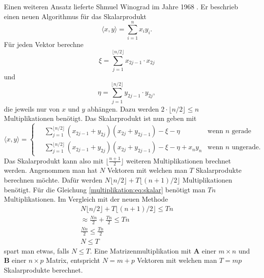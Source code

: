 Einen weiteren Ansatz lieferte Shmuel Winograd im Jahre 1968 \cite{multiplikation:winograd_1968}.
Er beschrieb einen neuen Algorithmus f\"ur das Skalarprodukt
\begin{equation} \label{multiplikation:eq:skalar}
	\langle x,y \rangle = \sum_{i=1}^{n}x_i y_i.
\end{equation}
F\"ur jeden Vektor berechne
\begin{equation}
	\xi = \sum_{j=1}^{ \lfloor n/2 \rfloor} x_{2j-1} \cdot x_{2j}
\end{equation}
und
\begin{equation}
	\eta = \sum_{j=1}^{ \lfloor n/2 \rfloor} y_{2j-1} \cdot y_{2j},
\end{equation}
die jeweils nur von $x$ und $y$ abhängen.
Dazu werden $2 \cdot  \lfloor n/2 \rfloor \leq n$ Multiplikationen benötigt.
Das Skalarprodukt ist nun geben mit
\begin{equation}
	\langle x,y \rangle =
	\begin{cases}
	 \displaystyle \quad \sum_{j=1}^{ \lfloor n/2 \rfloor} (x_{2j-1} + y_{2j})(x_{2j}+y_{2j-1})-\xi - \eta & \text{wenn  $n$ gerade}\\
	\displaystyle  \quad \sum_{j=1}^{ \lfloor n/2 \rfloor} (x_{2j-1} + y_{2j})(x_{2j}+y_{2j-1})-\xi - \eta + x_n y_n & \text{wenn  $n$ ungerade}.
	\end{cases}
\end{equation}
Das Skalarprodukt kann also mit $ \lfloor \frac{n+1}{2} \rfloor$ weiteren Multiplikationen brechnet werden.
Angenommen man hat $N$ Vektoren mit welchen man $T$ Skalarprodukte berechnen m\"ochte.
Daf\"ur werden $N\lfloor n/2 \rfloor + T\lfloor (n+1)/2 \rfloor $ Multiplikationen ben\"otigt.
Für die Gleichung \eqref{multiplikation:eq:skalar} benötigt man $Tn$ Multiplikationen.
Im Vergleich mit der neuen Methode
\begin{equation}
	\begin{split}\label{multiplikation:eq:eff}
		N\lfloor n/2 \rfloor + T\lfloor (n+1)/2 \rfloor \leq Tn \\
		\approx \frac{Nn}{2} + \frac{Tn}{2} \leq Tn \\
		\frac{Nn}{2} \leq \frac{Tn}{2} \\
		N \leq T
\end{split}
\end{equation}
spart man etwas, falls $N\leq T$.
Eine Matrizenmultiplikation mit $\mathbf{A}$ einer $m \times n$ und $\mathbf{B}$ einer $n \times p$ Matrix, entspricht $N=m+p$ Vektoren mit welchen man $T=mp$ Skalarprodukte berechnet.
